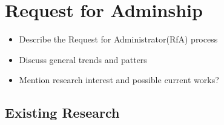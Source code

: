 \section{Request for Adminship}
\begin{itemize}
    \item Describe the Request for Administrator(RfA) process
    \item Discuss general trends and patters
    \item Mention research interest and possible current works?
\end{itemize}

\subsection{Existing Research}